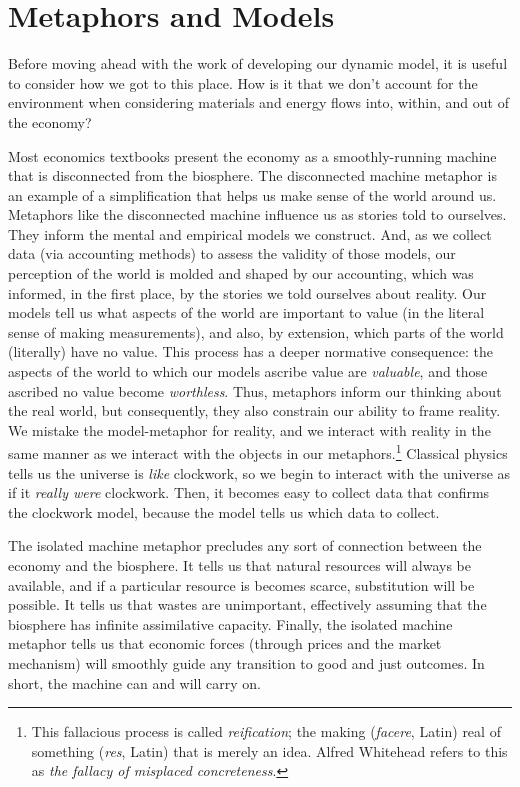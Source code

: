 \section{Metaphors and Models}
\label{sec:metaphors_and_models}

Before moving ahead with the work of developing our dynamic model,
it is useful to consider how we got to this place. 
How is it that we don't account for the environment when 
considering materials and energy flows into, within, and out of the economy?

Most economics textbooks present the economy as a smoothly-running machine
that is disconnected from the biosphere.
The disconnected machine metaphor is an example of a simplification 
that helps us make sense of the world around us.
Metaphors like the disconnected machine influence us as stories told to ourselves.
They inform the mental and empirical models we construct.
And, as we collect data (via accounting methods) 
to assess the validity of those models,
our perception of the world is molded and shaped
by our accounting, which was informed, in the first place,
by the stories we told ourselves about reality.
Our models tell us what aspects of the world
are important to value 
(in the literal sense of making measurements),
and also, by extension, 
which parts of the world (literally) have no value.
This process has a deeper normative
consequence: the aspects of the world to which our models ascribe
value are \emph{valuable},
and those ascribed no value become \emph{worthless}.
Thus, metaphors inform our thinking about the real world,
but consequently,
they also constrain our ability to frame reality.
We mistake the model-metaphor for reality, and
we interact with reality in the same manner 
as we interact with the objects in our
metaphors.\footnote{This fallacious process is called
	\emph{reification}; the making (\emph{facere}, Latin) real of
	something (\emph{res}, Latin) that is merely an idea.
	Alfred Whitehead refers to this as
	\emph{the fallacy of misplaced concreteness}.\cite{Whitehead2011}}
Classical physics tells us the universe is
\emph{like} clockwork, 
so we begin to interact with the universe
as if it \emph{really were} clockwork.
Then, it becomes easy to collect data that confirms the clockwork model,
because the model tells us which data to collect.

The isolated machine metaphor precludes any sort of connection 
between the economy and the biosphere. 
It tells us that natural resources will always be available, 
and if a particular resource is becomes scarce, substitution will be possible.
It tells us that wastes are unimportant, effectively assuming that the biosphere
has infinite assimilative capacity.
Finally, the isolated machine metaphor tells us that economic forces 
(through prices and the market mechanism) will smoothly guide any transition
to good and just outcomes.
In short, the machine can and will carry on.

